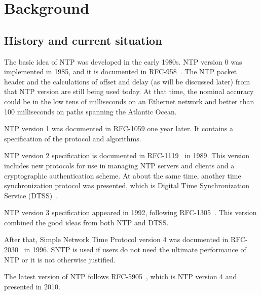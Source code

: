 
\chapter{Background}

\section{History and current situation}%
\label{sec:history_and_current_situation}
The basic idea of NTP was developed in the early 1980s. NTP version 0 was
implemented in 1985, and it is documented in RFC-958~\cite{rfc958}. 
The NTP packet header and the calculations of offset and delay (as will be
discussed later) from that NTP version are still being used today. At that
time, the nominal accuracy could be in the low tens of milliseconds on an
Ethernet network and better than 100 milliseconds on paths spanning the
Atlantic Ocean.

NTP version 1 was documented in RFC-1059 one year later. It contains a
specification of the protocol and algorithms.

NTP version 2 specification is documented in RFC-1119~\cite{rfc1119} in 1989.
This version
includes new protocols for use in managing NTP servers and clients and a
cryptographic authentication scheme.
At about the same time, another time synchronization protocol was presented,
which is Digital Time Synchronization Service (DTSS)~\cite{DTSS}.

NTP version 3 specification appeared in 1992, following
RFC-1305~\cite{rfc1305}. This version combined the good ideas from both NTP and
DTSS\null.

After that, Simple Network Time Protocol version 4 was documented in
RFC-2030~\cite{rfc2030}
in 1996. SNTP is used if users do not need the ultimate performance of NTP or
it is not otherwise justified.

The latest version of NTP follows RFC-5905~\cite{rfc5905}, which is NTP version
4 and presented in 2010.

